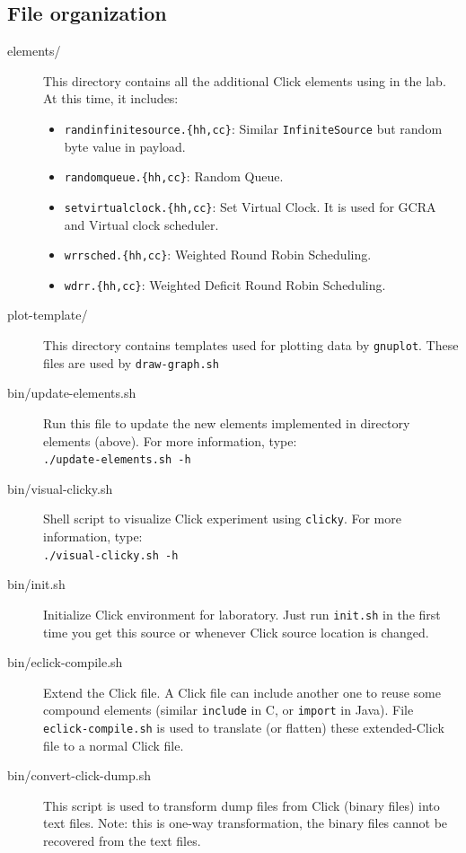 \documentclass[a4paper]{article}
\begin{document}
    \subsection{File organization}
      \begin{description}
      	\item[elements/] This directory contains all the additional Click elements using in the lab. At this time, it includes:
      	\begin{itemize}
      		\item \texttt{randinfinitesource.\{hh,cc\}}: Similar \texttt{InfiniteSource} but random byte value in payload.
      		\item \texttt{randomqueue.\{hh,cc\}}: Random Queue.
      		\item \texttt{setvirtualclock.\{hh,cc\}}: Set Virtual Clock. It is used for GCRA and Virtual clock scheduler.
      		\item \texttt{wrrsched.\{hh,cc\}}: Weighted Round Robin Scheduling.
      		\item \texttt{wdrr.\{hh,cc\}}: Weighted Deficit Round Robin Scheduling.
      	\end{itemize}
      	\item[plot-template/] This directory contains templates used for plotting data by \texttt{gnuplot}. These files are used by \texttt{draw-graph.sh}
      	\item[bin/update-elements.sh] Run this file to update the new elements implemented in directory elements (above). For more information, type: \\
      	\texttt{./update-elements.sh -h}
      	\item[bin/visual-clicky.sh]Shell script to visualize Click experiment using \texttt{clicky}. For more information, type: \\ 
      	\texttt{./visual-clicky.sh -h}
      	\item[bin/init.sh]Initialize Click environment for laboratory. Just run \texttt{init.sh} in the first time you get this source or whenever Click source location is changed.
      	\item[bin/eclick-compile.sh] Extend the Click file. A Click file can include another one to reuse some compound elements (similar \texttt{include} in C, or \texttt{import} in Java). File \texttt{eclick-compile.sh} is used to translate (or flatten) these extended-Click file to a normal Click file.
      	\item[bin/convert-click-dump.sh]This script is used to transform dump files from Click (binary files) into text files. Note: this is one-way transformation, the binary files cannot be recovered from the text files.

\end{description}
\end{document}
